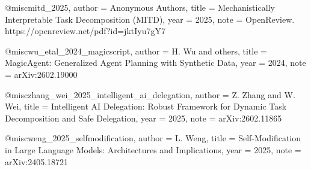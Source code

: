 @misc{mitd_2025,
  author       = {Anonymous Authors},
  title        = {Mechanistically Interpretable Task Decomposition (MITD)},
  year         = {2025},
  note         = {OpenReview. https://openreview.net/pdf?id=jktIyu7gY7}
}

@misc{wu_etal_2024_magicscript,
  author       = {H. Wu and others},
  title        = {MagicAgent: Generalized Agent Planning with Synthetic Data},
  year         = {2024},
  note         = {arXiv:2602.19000}
}

@misc{zhang_wei_2025_intelligent_ai_delegation,
  author       = {Z. Zhang and W. Wei},
  title        = {Intelligent AI Delegation: Robust Framework for Dynamic Task Decomposition and Safe Delegation},
  year         = {2025},
  note         = {arXiv:2602.11865}
}

@misc{weng_2025_selfmodification,
  author       = {L. Weng},
  title        = {Self-Modification in Large Language Models: Architectures and Implications},
  year         = {2025},
  note         = {arXiv:2405.18721}
}
